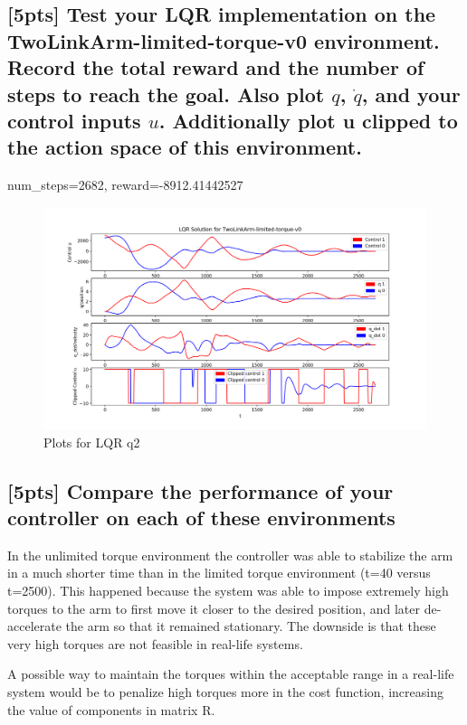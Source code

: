 \documentclass{article}
\begin{document}
\subsection{[5pts] Test your LQR implementation on the TwoLinkArm-limited-torque-v0 environment. Record the total reward and the number of steps to reach the goal. Also plot $q$, $\dot{q}$, and your control inputs $u$. Additionally plot u clipped to the action space of this environment.}

num\_steps=2682, reward=-8912.41442527

\begin{figure}[H] \label{fig:lqr_qn2}
  \centering
  \includegraphics[width=1.2\textwidth]{images/lqr_qn2}
  \caption{Plots for LQR q2}
\end{figure}

\subsection{[5pts] Compare the performance of your controller on each of these environments}

In the unlimited torque environment the controller was able to stabilize the arm in a much shorter time than in the limited torque environment (t=40 versus t=2500). This happened because the system was able to impose extremely high torques to the arm to first move it closer to the desired position, and later de-accelerate the arm so that it remained stationary. The downside is that these very high torques are not feasible in real-life systems. 

A possible way to maintain the torques within the acceptable range in a real-life system would be to penalize high torques more in the cost function, increasing the value of components in matrix R.
\end{document}
